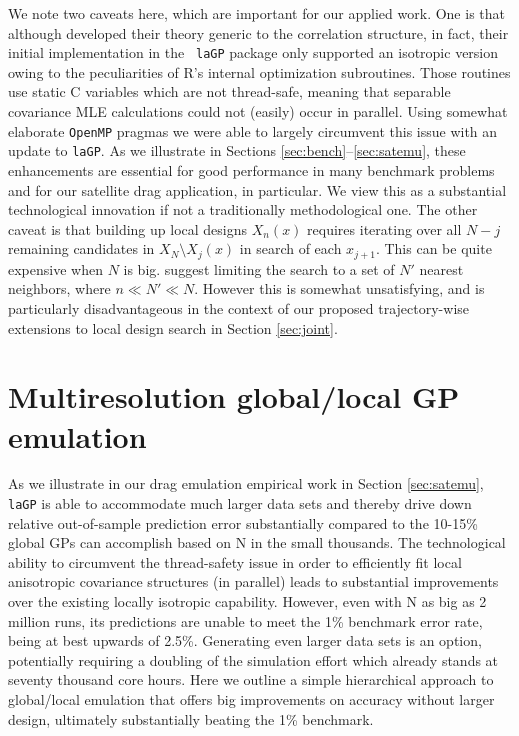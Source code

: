 \documentclass[12pt]{article}
\begin{document}
We note two caveats here, which are important for our applied work. One is
that although \citeauthor{gramacy:apley:2015} developed their theory generic
to the correlation structure, in fact, their initial implementation in the {\tt
laGP} package \cite{laGP,gramacy:jss:2016} only supported an isotropic version
owing to the peculiarities of {\sf R}'s internal optimization subroutines.
Those routines use static {\sf C} variables which are not thread-safe, meaning
that separable covariance MLE calculations could not (easily) occur in
parallel. Using somewhat elaborate {\tt OpenMP} pragmas we were able to
largely circumvent this issue with an update to {\tt laGP}. As we illustrate
in Sections \ref{sec:bench}--\ref{sec:satemu}, these enhancements are
essential for good performance in many benchmark problems and for our
satellite drag application, in particular.  We view this as a substantial
technological innovation if not a traditionally methodological one.  The other
caveat is that building up local designs $X_n(x)$ requires iterating over all
$N-j$ remaining candidates in $X_N \setminus X_j(x)$ in search of each
$x_{j+1}$. This can be quite expensive when $N$ is big.
\citeauthor{gramacy:apley:2015} suggest limiting the search to a set of $N'$
nearest neighbors, where $n \ll N' \ll N$.  However this is somewhat
unsatisfying, and is particularly disadvantageous in the context of our
proposed trajectory-wise extensions to local design search in Section
\ref{sec:joint}.

\section{Multiresolution global/local GP emulation}
\label{sec:mrlaGP}

As we illustrate in our drag emulation empirical work in Section
\ref{sec:satemu}, {\tt laGP} is able to accommodate much larger data sets and
thereby drive down relative out-of-sample prediction error substantially
compared to the 10-15\% global GPs can accomplish based on N in the small
thousands.  The technological ability to circumvent the thread-safety issue in
order to efficiently fit local anisotropic covariance structures (in parallel)
leads to substantial improvements over the existing locally isotropic
capability. However, even with N as big as 2 million runs, its predictions
are unable to meet the 1\% benchmark error rate, being at best upwards of
2.5\%. Generating even larger data sets is an option, potentially requiring
a doubling of the simulation effort which already stands at seventy thousand
core hours.  Here we outline a simple hierarchical approach to global/local
emulation that offers big improvements on accuracy without larger design,
ultimately substantially beating the 1\% benchmark.
\end{document}
